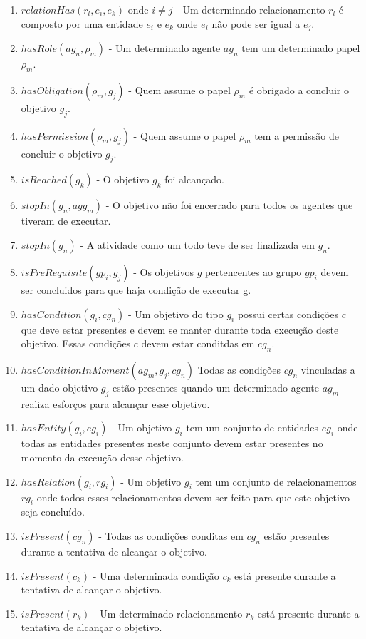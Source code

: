 \documentclass[12pt]{article}
\begin{document}
\begin{enumerate}
	\item $relationHas(r_l,e_i,e_k)$ onde $i \neq j$ - Um determinado relacionamento $r_l$ é composto por uma entidade $e_i$ e $e_k$ onde $e_i$ não pode ser igual a $e_j$.	
	\item $hasRole(ag_n,\rho_m)$ - Um determinado agente $ag_n$ tem um determinado papel $\rho_m$.
	\item $hasObligation(\rho_m,g_j)$ - Quem assume o papel $\rho_m$ é obrigado a concluir o objetivo $g_j$.
	\item $hasPermission(\rho_m,g_j)$ - Quem assume o papel $\rho_m$ tem a permissão de concluir o objetivo $g_j$.
	\item $isReached(g_k)$ - O objetivo $g_k$ foi alcançado.
	\item $stopIn(g_n,agg_m)$ - O objetivo não foi encerrado para todos os agentes que tiveram de executar. 	 				
	\item $stopIn(g_n)$ - A atividade como um todo teve de ser finalizada em $g_n$.	 			
	\item $isPreRequisite(gp_i,g_j)$ - Os objetivos $g$ pertencentes ao grupo $gp_i$ devem ser concluidos para que haja condição de executar g.
	\item $hasCondition(g_i,cg_n)$ - Um objetivo do tipo $g_i$ possui certas condições $c$ que deve estar presentes e devem se manter durante toda execução deste objetivo. Essas condições $c$ devem estar conditdas em $cg_n$. 
	\item $hasConditionInMoment(ag_m,g_j,cg_n)$ Todas as condições $cg_n$ vinculadas a um dado objetivo $g_j$ estão presentes quando um determinado agente $ag_m$ realiza esforços para alcançar esse objetivo. 
	\item $hasEntity(g_i,eg_i)$ - Um objetivo $g_i$ tem um conjunto de entidades $eg_i$ onde todas as entidades presentes neste conjunto devem estar presentes no momento da execução desse objetivo.
	\item $hasRelation(g_i,rg_i)$ - Um objetivo $g_i$ tem um conjunto de relacionamentos $rg_i$ onde todos esses relacionamentos devem ser feito para que este objetivo seja concluído.
	\item $isPresent(cg_n)$ - Todas as condições conditas em $cg_n$ estão presentes durante a tentativa de alcançar o objetivo.
	\item $isPresent(c_k)$ - Uma determinada condição $c_k$ está presente durante a tentativa de alcançar o objetivo.
	\item $isPresent(r_k)$ - Um determinado relacionamento $r_k$ está presente durante a tentativa de alcançar o objetivo.	

\end{enumerate}
\end{document}

